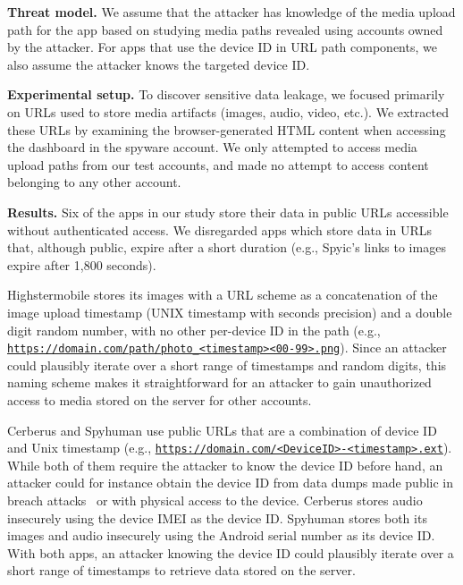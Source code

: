 \documentclass[sigconf,balance=false]{acmart}
\newcommand{\sumanth}[1]{\textcolor{violet}{\noindent[SR: #1]}}
\newcommand{\geoff}[1]{\textcolor{purple}{\noindent[GV: #1]}}
\newcommand{\sumanth}[1]{}
\newcommand{\geoff}[1]{}
\begin{document}
\textbf{Threat model.} We assume that the attacker has knowledge of
the media upload path for the app based on studying media paths
revealed using accounts owned by the attacker.  For apps that use the
device ID in URL path components, we also assume the attacker knows
the targeted device ID.

\textbf{Experimental setup.} To discover sensitive data leakage, we
focused primarily on URLs used to store media artifacts (images,
audio, video, etc.).  We extracted these URLs by examining the
browser-generated HTML content when accessing the dashboard in the
spyware account.  We only attempted to access media upload paths from
our test accounts, and made no attempt to access content belonging to
any other account.


\textbf{Results.}  Six of the apps in our study store their data in
public URLs accessible without authenticated access.  We disregarded
apps which store data in URLs that, although public, expire after a
short duration (e.g., Spyic's links to images expire after 1,800
seconds).


Highstermobile stores its images with a URL scheme as a concatenation
of the image upload timestamp (UNIX timestamp with seconds precision)
and a double digit random number, with no other per-device ID in the
path (e.g.,
\texttt{\url{https://domain.com/path/photo_<timestamp><00-99>.png}}).
Since an attacker could plausibly iterate over a short range of
timestamps and random digits, this naming scheme makes it
straightforward for an attacker to gain unauthorized access to media
stored on the server for other accounts.

Cerberus and Spyhuman use public URLs that are a combination of device
ID and Unix timestamp
(e.g., \texttt{\url{https://domain.com/<DeviceID>-<timestamp>.ext}}).
While both of them require the attacker to know the device ID before
hand, an attacker could for instance obtain the device ID from data
dumps made public in breach attacks~\cite{mSpybrea38:online,
  Companyt8:online, HackerSt66:online, Cerberus12:online,
  Stalkerw59:online} or with physical access to the device.
Cerberus stores audio insecurely using the device IMEI as the device
ID.  Spyhuman stores both its images and audio insecurely using the
Android serial number as its device ID.  With both apps, an attacker
knowing the device ID could plausibly iterate over a short range of
timestamps to retrieve data stored on the server.
\end{document}
